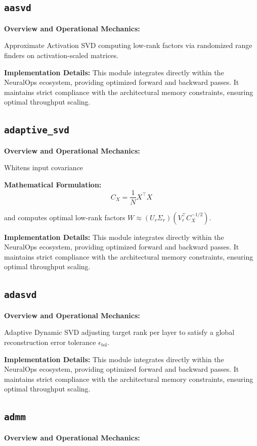 \documentclass[10pt,twocolumn,letterpaper]{article}
\begin{document}
\subsection{\texttt{aasvd}}
\textbf{Overview and Operational Mechanics:}

Approximate Activation SVD computing low-rank factors via randomized range finders on activation-scaled matrices.

\textbf{Implementation Details:}
This module integrates directly within the NeuralOps ecosystem, providing optimized forward and backward passes. It maintains strict compliance with the architectural memory constraints, ensuring optimal throughput scaling.

\subsection{\texttt{adaptive\_svd}}
\textbf{Overview and Operational Mechanics:}

Whitens input covariance

\textbf{Mathematical Formulation:}
\begin{equation}
C_X = \frac{1}{N}X^\top X
\end{equation}

and computes optimal low-rank factors $W \approx (U_r \Sigma_r)(V_r^\top C_X^{-1/2})$.

\textbf{Implementation Details:}
This module integrates directly within the NeuralOps ecosystem, providing optimized forward and backward passes. It maintains strict compliance with the architectural memory constraints, ensuring optimal throughput scaling.

\subsection{\texttt{adasvd}}
\textbf{Overview and Operational Mechanics:}

Adaptive Dynamic SVD adjusting target rank per layer to satisfy a global reconstruction error tolerance $\epsilon_{\text{tol}}$.

\textbf{Implementation Details:}
This module integrates directly within the NeuralOps ecosystem, providing optimized forward and backward passes. It maintains strict compliance with the architectural memory constraints, ensuring optimal throughput scaling.

\subsection{\texttt{admm}}
\textbf{Overview and Operational Mechanics:}
\end{document}
